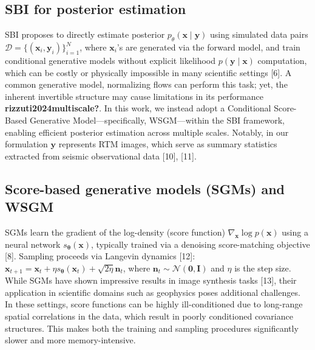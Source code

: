\documentclass[
]{article}
\begin{document}
\subsection{SBI for posterior
estimation}\label{sbi-for-posterior-estimation}

SBI proposes to directly estimate posterior
\(p_{\theta}(\mathbf{x} \mid \mathbf{y})\) using simulated data pairs
\(\mathcal{D} = \{ (\mathbf{x}_i, \mathbf{y}_i) \}_{i=1}^{N}\), where
\(\mathbf{x}_i\)'s are generated via the forward model, and train
conditional generative models without explicit likelihood
\(p(\mathbf{y} \mid \mathbf{x})\) computation, which can be costly or
physically impossible in many scientific settings {[}6{]}. A common
generative model, normalizing flows can perform this task; yet, the
inherent invertible structure may cause limitations in its performance
\textbf{rizzuti2024multiscale?}. In this work, we instead adopt a
Conditional Score-Based Generative Model---specifically, WSGM---within
the SBI framework, enabling efficient posterior estimation across
multiple scales. Notably, in our formulation \(\mathbf{y}\) represents
RTM images, which serve as summary statistics extracted from seismic
observational data {[}10{]}, {[}11{]}.

\subsection{Score-based generative models (SGMs) and
WSGM}\label{score-based-generative-models-sgms-and-wsgm}

SGMs learn the gradient of the log-density (score function)
\(\nabla_{\mathbf{x}} \log p(\mathbf{x})\) using a neural network
\(s_{\boldsymbol{\theta}}(\mathbf{x})\), typically trained via a
denoising score-matching objective {[}8{]}. Sampling proceeds via
Langevin dynamics {[}12{]}:
\(\mathbf{x}_{t+1} = \mathbf{x}_t + \eta s_{\boldsymbol{\theta}}(\mathbf{x}_t) + \sqrt{2 \eta} \mathbf{n}_t\),
where \(\mathbf{n}_t \sim \mathcal{N}(\mathbf{0}, \mathbf{I})\) and
\(\eta\) is the step size. While SGMs have shown impressive results in
image synthesis tasks {[}13{]}, their application in scientific domains
such as geophysics poses additional challenges. In these settings, score
functions can be highly ill-conditioned due to long-range spatial
correlations in the data, which result in poorly conditioned covariance
structures. This makes both the training and sampling procedures
significantly slower and more memory-intensive.
\end{document}
